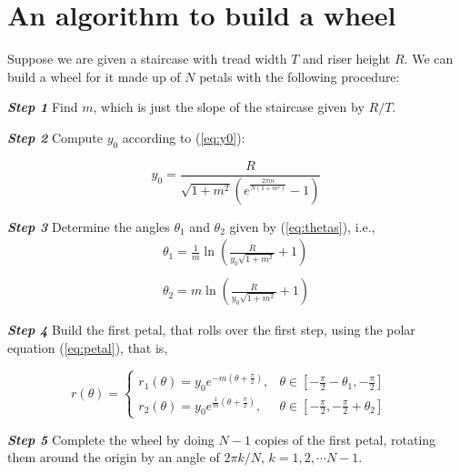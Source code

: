 \documentclass{article}
\theoremstyle{theorem}
\theoremstyle{theorem}
\begin{document}
\section{An algorithm to build a wheel}
\label{sec:algorithm}

Suppose we are given a staircase with tread width $T$ and riser height
$R$. We can build a wheel for it made up of $N$ petals with the
following procedure:

\vspace*{0.15 cm}
\noindent \emph{\textbf{Step 1}} Find $m$, which is just the slope of
the staircase given by $R/T$.

\vspace*{0.15 cm}
\noindent \emph{\textbf{Step 2}} Compute $y_0$ according to
(\ref{eq:y0}):

  \begin{equation}
    y_0=\frac{R}{\sqrt{1+m^2}\left(e^{\frac{2\pi m}{N(1+m^2)}}-1\right)}
  \end{equation}

  \vspace*{0.15 cm}
  \noindent \emph{\textbf{Step 3}} Determine the angles $\theta_1$ and
  $\theta_2$ given by (\ref{eq:thetas}), i.e.,
  \begin{equation}
    \begin{array}{c}
      \displaystyle
      \theta_1=\frac{1}{m}\ln\left(\frac{R}{y_0\sqrt{1+m^2}}+1\right) \\
      \\
      \displaystyle \theta_2=m\ln\left(\frac{R}{y_0\sqrt{1+m^2}}+1\right)
    \end{array}
  \end{equation}

  \noindent \emph{\textbf{Step 4}} Build the first petal, that rolls
  over the first step, using the polar equation (\ref{eq:petal}), that
  is,

\begin{equation}
  r(\theta)=
  \left \lbrace
    \begin{array}{ll}
      r_1(\theta) = y_0e^{-m\left(\theta+\frac{\pi}{2}\right)}, & \theta \in \left[-\frac{\pi}{2}-\theta_1,-\frac{\pi}{2}\right] \\
      r_2(\theta) = y_0e^{\frac{1}{m}\left(\theta+\frac{\pi}{2}\right)}, & \theta \in \left[-\frac{\pi}{2}, -\frac{\pi}{2}+\theta_2\right]
    \end{array}
  \right. \quad
\end{equation}

\noindent \emph{\textbf{Step 5}} Complete the wheel by doing $N-1$
copies of the first petal, rotating them around the origin by an angle
of $2\pi k/N, \, k=1, 2, \cdots N-1$.
\end{document}
